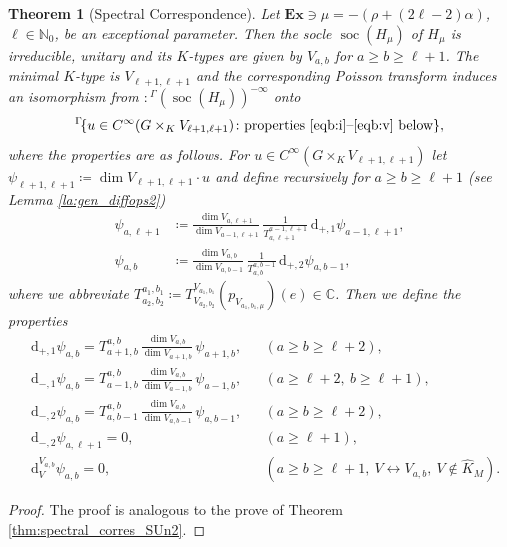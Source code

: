\documentclass[JEP,XML,SOM,NoFloatCountersInSection,Unicode,published]{cedram}
\newcommand{\Ga}{{}^\Gamma\!}
\newtheorem{theorem}{Theorem}[section]
\theoremstyle{definition}
\newcommand{\lra}{\ensuremath{\leftrightarrow}}
\newcommand{\on}[1]{\ensuremath{\operatorname{#1}}}
\newcommand{\rhoa}{\ensuremath{\rho}}
\newcommand{\N}{\ensuremath{\mathbb{N}}}
\newcommand{\C}{\ensuremath{\mathbb{C}}}
\newcommand{\pst}[1]{\ensuremath{H_{#1}}}
\begin{document}
\begin{theorem}[Spectral Correspondence]\label{thm:spectral_corres_Spn}
Let $\mathbf{Ex}\ni\mu=-(\rhoa+(2\ell-2)\alpha)$, $\ell\in\N_0$, be an exceptional parameter. Then the socle $\on{soc}(\pst{\mu})$ of $\pst{\mu}$ is irreducible, unitary and its $K$-types are given by $V_{a,b}$ for $a\geq b\geq\ell+1$. The minimal $K$-type is $V_{\ell+1,\ell+1}$ and the corresponding Poisson transform induces an isomorphism from $\colon\Ga(\on{soc}(\pst{\mu}))^{-\infty}$ onto
\[
\Ga\{u\in C^\infty(G\times_KV_{\ell+1,\ell+1})\colon \text{properties \eqref{eqb:i}--\eqref{eqb:v} below}\},
\]
where the properties are as follows. For $u\in C^\infty(G\times_KV_{\ell+1,\ell+1})$ let $\psi_{\ell+1,\ell+1}\coloneqq\dim V_{\ell+1,\ell+1}\cdot u$ and define recursively for $a\geq b\geq\ell+1$ (see Lemma \ref{la:gen_diffops2})
\begin{align*}
\psi_{a,\ell+1}&\coloneqq\frac{\dim V_{a,\ell+1}}{\dim V_{a-1,\ell+1}}\,\frac{1}{T^{a-1,\ell+1}_{a,\ell+1}}\,\mathrm{d}_{+,1}\psi_{a-1,\ell+1},\\ \psi_{a,b}&\coloneqq\frac{\dim V_{a,b}}{\dim V_{a,b-1}}\,\frac{1}{T^{a,b-1}_{a,b}}\,\mathrm{d}_{+,2}\psi_{a,b-1},
\end{align*}
where we abbreviate $T^{a_1,b_1}_{a_2,b_2}\coloneqq T_{V_{a_2,b_2}}^{V_{a_1,b_1}}(p_{V_{a_1,b_1,\mu}})(e)\in\C$. Then we define the properties
\begin{align*}
\tag{i}\label{eqb:i}&\mathrm{d}_{+,1}\psi_{a,b}=T_{a+1,b}^{a,b}\,\frac{\dim V_{a,b}}{\dim V_{a+1,b}}\,\psi_{a+1,b},&& (a\geq b\geq\ell+2),\\
\tag{ii}\label{eqb:ii}&\mathrm{d}_{-,1}\psi_{a,b}=T_{a-1,b}^{a,b}\,\frac{\dim V_{a,b}}{\dim V_{a-1,b}}\,\psi_{a-1,b},&& (a\geq\ell+2,\ b\geq\ell+1),\\
\tag{iii}\label{eqb:iii}&\mathrm{d}_{-,2}\psi_{a,b}=T_{a,b-1}^{a,b}\,\frac{\dim V_{a,b}}{\dim V_{a,b-1}}\,\psi_{a,b-1},&& (a\geq b\geq\ell+2),\\
\tag{iv}\label{eqb:iv}&\mathrm{d}_{-,2}\psi_{a,\ell+1}=0,&& (a\geq\ell+1),\\
\tag{v}\label{eqb:v}&\mathrm{d}^{V_{a,b}}_V\psi_{a,b}=0,&& (a\geq b\geq\ell+1,\ V\lra V_{a,b},\ V\not\in\hat K_M).
\end{align*}
\end{theorem}

\begin{proof}
The proof is analogous to the prove of Theorem \ref{thm:spectral_corres_SUn2}.
\end{proof}
\end{document}
